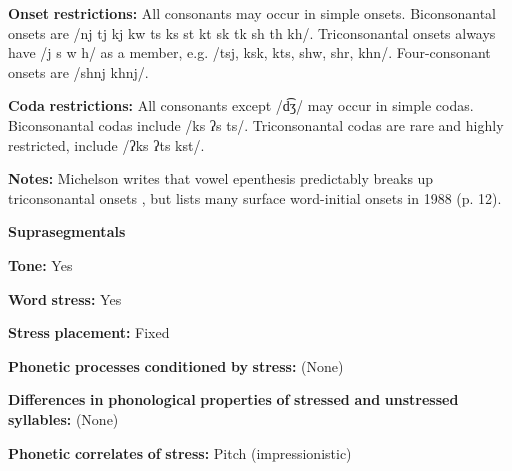 \begin{styleBody}
\textbf{Onset} \textbf{restrictions:} All consonants may occur in simple onsets. Biconsonantal onsets are /nj tj kj kw ts ks st kt sk tk sh th kh/. Triconsonantal onsets always have /j s w h/ as a member, e.g. /tsj, ksk, kts, shw, shr, khn/. Four-consonant onsets are /shnj khnj/.
\end{styleBody}

\begin{styleBody}
\textbf{Coda} \textbf{restrictions:} All consonants except /d͡ʒ/ may occur in simple codas. Biconsonantal codas include /ks ʔs ts/. Triconsonantal codas are rare and highly restricted, include /ʔks ʔts kst/.
\end{styleBody}

\begin{styleBody}
\textbf{Notes:} Michelson writes that vowel epenthesis predictably breaks up triconsonantal onsets , but lists many surface word-initial onsets in 1988 (p. 12).
\end{styleBody}

\begin{styleBody}
\textbf{Suprasegmentals}
\end{styleBody}

\begin{styleBody}
\textbf{Tone:} Yes
\end{styleBody}

\begin{styleBody}
\textbf{Word} \textbf{stress:} Yes
\end{styleBody}

\begin{styleBody}
\textbf{Stress} \textbf{placement:} Fixed
\end{styleBody}

\begin{styleBody}
\textbf{Phonetic} \textbf{processes} \textbf{conditioned} \textbf{by} \textbf{stress:} (None)
\end{styleBody}

\begin{styleBody}
\textbf{Differences} \textbf{in} \textbf{phonological} \textbf{properties} \textbf{of} \textbf{stressed} \textbf{and} \textbf{unstressed} \textbf{syllables:} (None)
\end{styleBody}

\begin{styleBody}
\textbf{Phonetic} \textbf{correlates} \textbf{of} \textbf{stress:} Pitch (impressionistic)
\end{styleBody}

